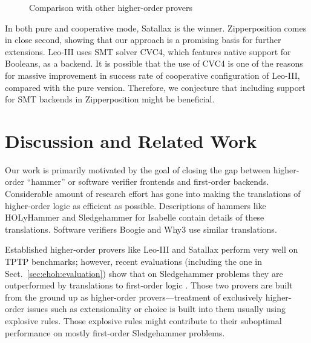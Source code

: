 \begin{figure}[t]
  \label{fig:higher-order-provers}
  \begin{center}
    \def\arraystretch{1.1}%
    \caption{Comparison with other higher-order provers}
  \end{center}
\end{figure}

In both pure and cooperative mode, Satallax is the winner.
Zipperposition comes in close second, showing that our approach is a promising
basis for further extensions. Leo-III uses SMT solver CVC4, which features
native support for Booleans, as a backend. It is possible that the use of CVC4 is
one of the reasons for massive improvement in success rate of cooperative
configuration of Leo-III, compared with the pure version. Therefore, we conjecture
that including support for SMT backends in Zipperposition might be beneficial.\section{Discussion and Related Work} 
\label{sect:bool:discussion}

Our work is primarily motivated by the goal of closing the gap between
higher-order ``hammer'' or software verifier frontends and first-order backends.
Considerable amount of research effort has gone into making the translations of
higher-order logic as efficient as possible. Descriptions of hammers like
HOLyHammer \cite{ku-15-holyhammer} and Sledgehammer
\cite{pb-12-sh} for Isabelle contain details of these
translations. Software verifiers Boogie \cite{lr-10-boogie} and Why3
\cite{bfcp-11-why3} use similar translations.

Established higher-order provers like Leo-III and Satallax perform very
well on TPTP benchmarks; however, recent evaluations (including the one in Sect.~\ref{sec:ehoh:evaluation}) show that on Sledgehammer
problems they are outperformed by translations to first-order logic
\cite{bbtvw-21-sup-lam, %
cbetal-11-cvc4}. Those two provers are built from the ground up as
higher-order provers---treatment of exclusively higher-order issues such as
extensionality or choice is built into them usually using explosive rules. Those
explosive rules might contribute to their suboptimal performance on mostly
first-order Sledgehammer problems.

